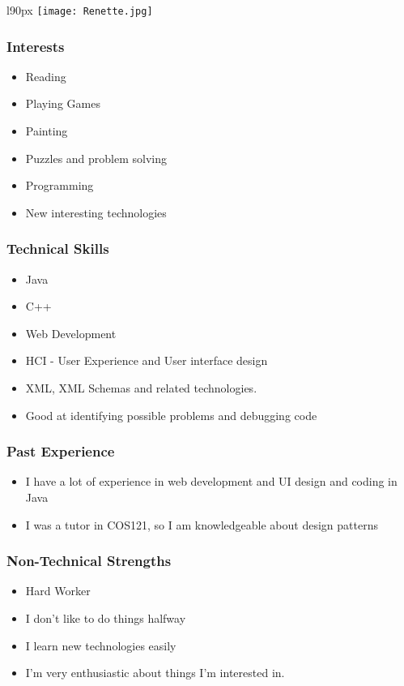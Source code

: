 \begin{wrapfigure}[8]{l}{90px}
\texttt{[image: Renette.jpg]}
\end{wrapfigure}
\textcolor{white}{}
\subsubsection{Interests}
\begin{itemize}
	\item Reading
	\item Playing Games
	\item Painting
	\item Puzzles and problem solving
	\item Programming
	\item New interesting technologies
\end{itemize}
\subsubsection{Technical Skills}
\begin{itemize}
	\item Java
	\item C++
	\item Web Development
	\item HCI - User Experience and User interface design
	\item XML, XML Schemas and related technologies.
	\item Good at identifying possible problems and debugging code
\end{itemize}
\subsubsection{Past Experience}
\begin{itemize}
	\item I have a lot of experience in web development and UI design and coding in Java
	\item I was a tutor in COS121, so I am knowledgeable about design patterns
\end{itemize}
\subsubsection{Non-Technical Strengths}
\begin{itemize}
	\item Hard Worker
	\item I don't like to do things halfway
	\item I learn new technologies easily
	\item I'm very enthusiastic about things I'm interested in.
\end{itemize}